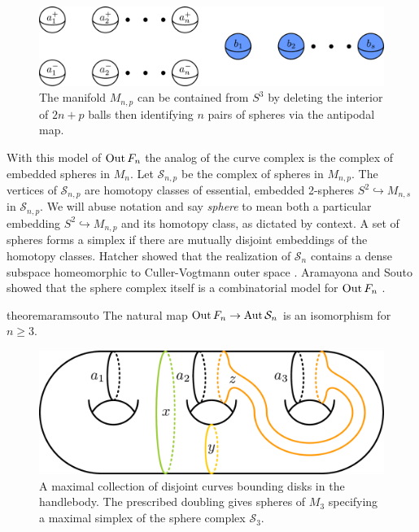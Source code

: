 \begin{figure}[h!]
  \centering
  \includegraphics[width=\textwidth]{figures/spherestoglue.pdf}
  \caption{The manifold $M_{n,p}$ can be contained from  $S^3$
  by deleting the interior of $2n+p$ balls then identifying
  $n$ pairs of spheres via the antipodal map.}
  \label{fig:sphereglue}
\end{figure}


With this model of $\operatorname{Out} F_n$
the analog of the curve complex is the complex of embedded spheres in $M_n$.
Let $\mathcal S_{n,p}$
be the complex of spheres in $M_{n,p}$.
The vertices of $\mathcal S_{n,p}$ are
homotopy classes of essential, embedded 2-spheres $S^2 \hookrightarrow M_{n,s}$ in $\mathcal S_{n,p}$.
We will abuse notation and say \emph{sphere} to mean both a particular embedding $S^2\hookrightarrow M_{n,p}$
and its homotopy class, as dictated by context.
A set of spheres forms a simplex if there are mutually disjoint embeddings of the homotopy classes.
Hatcher showed that
the realization of $\mathcal S_{n}$
contains a dense subspace homeomorphic to Culler-Vogtmann outer space \cite{MR1314940}.
Aramayona and Souto showed that the sphere complex itself is
a combinatorial model for $\operatorname{Out} F_n$ \cite{souto}.

\begin{restatable}{theorem}{aramsouto}
\label{aramsouto}
The natural map $\operatorname{Out} F_n \to \operatorname{Aut} \mathcal S_n $ is an isomorphism for $n\geq 3$.
\end{restatable}

\begin{figure}[h!]
  \centering
  \includegraphics[width=.7\textwidth]{figures/samplecurves.pdf}
  \caption{
  A maximal collection of disjoint curves bounding disks in the handlebody.
  The prescribed doubling gives spheres of $M_3$
  specifying a maximal simplex of the sphere complex $\mathcal S_3$.
  }
  \label{fig:samplecurves}
\end{figure}


